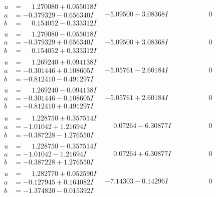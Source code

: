 \documentclass[1p]{elsarticle_modified}
\theoremstyle{definition}
\begin{document}
$$\begin{array}{c|c|c}
\begin{aligned}
u &= \phantom{-}1.270080 + 0.055018 I \\
a &= -0.379329 - 0.656340 I \\
b &= \phantom{-}0.154052 - 0.333312 I\end{aligned}
 & -5.09500 - 3.08368 I & \phantom{-0.000000 } 0 \\ \hline\begin{aligned}
u &= \phantom{-}1.270080 - 0.055018 I \\
a &= -0.379329 + 0.656340 I \\
b &= \phantom{-}0.154052 + 0.333312 I\end{aligned}
 & -5.09500 + 3.08368 I & \phantom{-0.000000 } 0 \\ \hline\begin{aligned}
u &= \phantom{-}1.269240 + 0.094138 I \\
a &= -0.301446 + 0.108605 I \\
b &= -0.812410 - 0.491297 I\end{aligned}
 & -5.05761 - 2.60184 I & \phantom{-0.000000 } 0 \\ \hline\begin{aligned}
u &= \phantom{-}1.269240 - 0.094138 I \\
a &= -0.301446 - 0.108605 I \\
b &= -0.812410 + 0.491297 I\end{aligned}
 & -5.05761 + 2.60184 I & \phantom{-0.000000 } 0 \\ \hline\begin{aligned}
u &= \phantom{-}1.228750 + 0.357514 I \\
a &= -1.01042 + 1.21694 I \\
b &= -0.387228 - 1.276550 I\end{aligned}
 & \phantom{-}0.07264 - 6.30877 I & \phantom{-0.000000 } 0 \\ \hline\begin{aligned}
u &= \phantom{-}1.228750 - 0.357514 I \\
a &= -1.01042 - 1.21694 I \\
b &= -0.387228 + 1.276550 I\end{aligned}
 & \phantom{-}0.07264 + 6.30877 I & \phantom{-0.000000 } 0 \\ \hline\begin{aligned}
u &= \phantom{-}1.282770 + 0.052590 I \\
a &= -0.127945 + 0.164082 I \\
b &= -1.374820 - 0.015392 I\end{aligned}
 & -7.14303 - 0.14296 I & \phantom{-0.000000 } 0 \\ \hline\begin{aligned}

\end{aligned}
\end{array}$$
\end{document}
